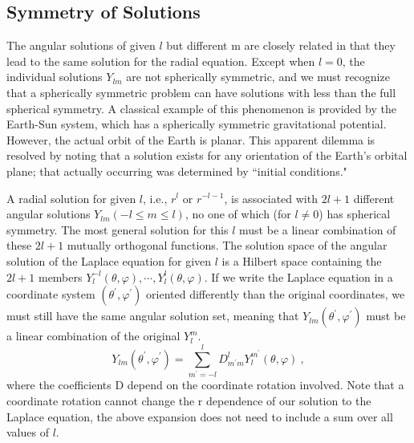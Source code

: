 \documentclass[12pt,a4paper]{article}
\begin{document}
\subsection{Symmetry of Solutions}
The angular solutions of given $l$ but different m are closely related in that they lead to the same solution for the radial equation. Except when $l = 0$, the individual solutions $Y_{lm}$ are not spherically symmetric, and we must recognize that a spherically symmetric problem can have solutions with less than the full spherical symmetry. A classical example of this
phenomenon is provided by the Earth-Sun system, which has a spherically symmetric gravitational potential. However, the actual orbit of the Earth is planar. This apparent dilemma is resolved by noting that a solution exists for any orientation of the Earth’s orbital plane; that actually occurring was determined by ``initial conditions."

A radial solution for given $l$, i.e., $r^l$ or $r^{-l-1}$, is associated with $2l + 1$ different angular solutions $Y_{lm}(-l \leqslant m \leqslant l)$, no one of which (for $l \neq 0$) has spherical symmetry. The most general solution for this $l$ must be a linear combination of these $2l + 1$ mutually orthogonal functions. The solution space of the angular solution of the Laplace equation for given $l$ is a Hilbert space containing the $2l +1$ members $Y_{l}^{-l}(\theta,\varphi), \cdots, Y_{l}^{l}(\theta,\varphi)$. If we write the Laplace equation in a coordinate system $(\theta^\prime,\varphi^\prime)$ oriented differently than the original coordinates, we must still have the same angular solution set, meaning that $Y_{lm}(\theta^\prime,\varphi^\prime)$ must be a linear combination of the original $Y_l^m$.
\begin{equation}
Y_{lm}(\theta^\prime,\varphi^\prime) = \sum_{m^\prime = -l}^l D_{m^\prime m}^l Y_{l}^{m^\prime} (\theta,\varphi) ~,
\end{equation}
where the coefficients D depend on the coordinate rotation involved. Note that a coordinate rotation cannot change the r dependence of our solution to the Laplace equation, the above expansion does not need to include a sum over all values of $l$.
\end{document}
